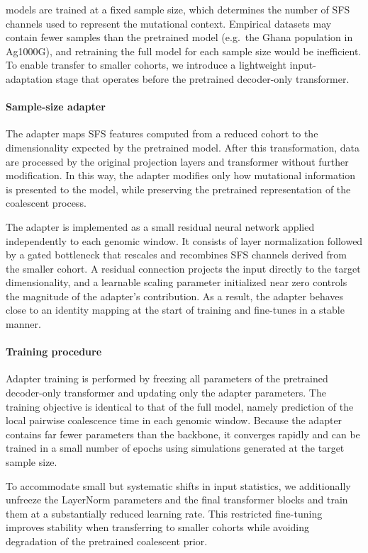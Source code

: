 \documentclass[9pt,twocolumn,twoside]{pnas-new}
\begin{document}
{\cxtkit models are trained at a fixed sample size, which determines the number of
SFS channels used to represent the mutational context.
Empirical datasets may contain fewer samples than the pretrained model
(e.g.\ the Ghana population in Ag1000G), and retraining the full model for each
sample size would be inefficient.
To enable transfer to smaller cohorts, we introduce a lightweight input-adaptation stage that operates
before the pretrained decoder-only transformer.

\paragraph{Sample-size adapter}
The adapter maps SFS features computed from a reduced cohort to the dimensionality
expected by the pretrained model.
After this transformation, data are processed by the original projection layers
and transformer without further modification.
In this way, the adapter modifies only how mutational information is presented to
the model, while preserving the pretrained representation of the coalescent process.

The adapter is implemented as a small residual neural network applied independently
to each genomic window.
It consists of layer normalization followed by a gated bottleneck that rescales and
recombines SFS channels derived from the smaller cohort.
A residual connection projects the input directly to the target dimensionality, and
a learnable scaling parameter initialized near zero controls the magnitude of the
adapter's contribution.
As a result, the adapter behaves close to an identity mapping at the start of
training and fine-tunes in a stable manner.

\paragraph{Training procedure}
Adapter training is performed by freezing all parameters of the pretrained
decoder-only transformer and updating only the adapter parameters.
The training objective is identical to that of the full model, namely prediction of
the local pairwise coalescence time in each genomic window.
Because the adapter contains far fewer parameters than the backbone, it converges
rapidly and can be trained in a small number of epochs using simulations generated
at the target sample size.

To accommodate small but systematic shifts in input statistics, we additionally
unfreeze the LayerNorm parameters and the final transformer blocks and train them at
a substantially reduced learning rate.
This restricted fine-tuning improves stability when transferring to smaller cohorts
while avoiding degradation of the pretrained coalescent prior.

}
\end{document}
